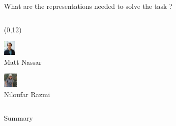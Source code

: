\documentclass[bigger]{beamer}
\begin{document}
\begin{frame}[label={sec:org83f12bc}]{What are the representations needed to solve the task ?}
\begin{columns}
\begin{column}{0.5\columnwidth}
\begin{textblock}{5}(0,12)
\begin{minipage}[t]{3em}
\center
\includegraphics[height=2em]{img/matt-nassar.jpg}\\
\scriptsize
Matt Nassar
\end{minipage}
\begin{minipage}[t]{3em}
\center
\includegraphics[height=2em]{img/niloufar-razmi.jpeg}\\
\scriptsize
Niloufar Razmi
\end{minipage}
\end{textblock}
\end{column}
\end{columns}
\end{frame}

\begin{frame}[label={sec:orgc7de864}]{Summary}
\end{frame}
\end{document}
